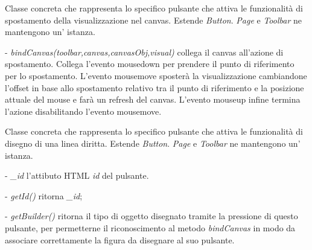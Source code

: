Classe concreta che rappresenta lo specifico pulsante che attiva le funzionalit\` a di spostamento della visualizzazione nel canvas.
Estende \textit{Button}.
\textit{Page} e \textit{Toolbar} ne mantengono un' istanza.
\begin{elencopuntato}[\subsubsecindent]
\item[-] \textit{bindCanvas(toolbar,canvas,canvasObj,visual)} collega il canvas all'azione di spostamento. Collega l'evento mousedown per prendere il punto di riferimento per lo spostamento. L'evento mousemove sposter\`a la visualizzazione cambiandone l'offset in base allo spostamento relativo tra il punto di riferimento e la posizione attuale del mouse e far\`a un refresh del canvas. L'evento mouseup infine termina l'azione disabilitando l'evento mousemove.
\end{elencopuntato}

Classe concreta che rappresenta lo specifico pulsante che attiva le funzionalit\` a di disegno di una linea diritta.
Estende \textit{Button}.
\textit{Page} e \textit{Toolbar} ne mantengono un' istanza.
\begin{elencopuntato}[\subsubsecindent]
\item[-] \textit{{\_}id} l'attibuto HTML \textit{id} del pulsante.
\end{elencopuntato}
\begin{elencopuntato}[\subsubsecindent]
\item[-] \textit{getId()} ritorna \textit{{\_}id};
\item[-] \textit{getBuilder()} ritorna il tipo di oggetto disegnato tramite la pressione di questo pulsante, per permetterne il riconoscimento al metodo \textit{bindCanvas} in modo da associare correttamente la figura da disegnare al suo pulsante.
\end{elencopuntato}

